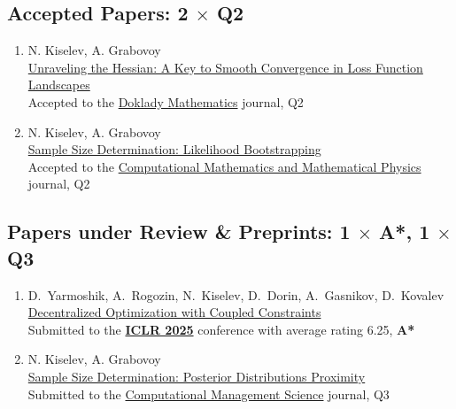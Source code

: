 \documentclass[11pt,a4paper]{moderncv}
\begin{document}
\subsection{Accepted Papers: 2 $\times$ Q2}
\begin{enumerate}
    \item N. Kiselev, A. Grabovoy\\
    \href{https://arxiv.org/abs/2409.11995}{Unraveling the Hessian: A Key to Smooth Convergence in Loss Function Landscapes}\\
    Accepted to the \href{https://link.springer.com/journal/11472}{Doklady Mathematics} journal, Q2
    \item N. Kiselev, A. Grabovoy\\
    \href{https://github.com/kisnikser/Likelihood-Bootstrapping}{Sample Size Determination: Likelihood Bootstrapping}\\
    Accepted to the \href{https://link.springer.com/journal/11470}{Computational Mathematics and Mathematical Physics} journal, Q2
\end{enumerate}
\subsection{Papers under Review \& Preprints: 1 $\times$ A*, 1 $\times$ Q3}
\begin{enumerate}%
    \item D.~Yarmoshik, A.~Rogozin, N.~Kiselev, D.~Dorin, A.~Gasnikov, D.~Kovalev\\
    \href{https://arxiv.org/abs/2407.02020}{Decentralized Optimization with Coupled Constraints}\\
    Submitted to the \href{https://iclr.cc/}{\textbf{ICLR 2025}} conference with average rating 6.25, \textbf{A*}
    \item N. Kiselev, A. Grabovoy\\
    \href{https://github.com/kisnikser/Posterior-Distributions-Proximity}{Sample Size Determination: Posterior Distributions Proximity}\\
    Submitted to the \href{https://link.springer.com/journal/10287}{Computational Management Science} journal, Q3
\end{enumerate}
\end{document}
